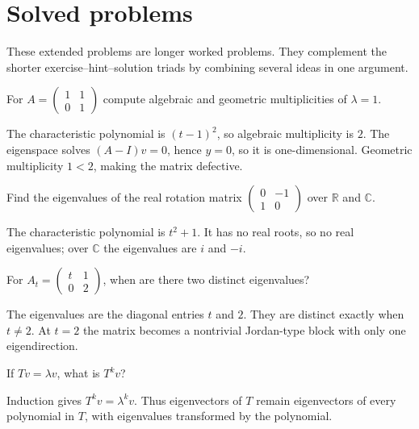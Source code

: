 \section{Solved problems}
These extended problems are longer worked problems. They complement the shorter exercise--hint--solution triads by combining several ideas in one argument.

\begin{problem}\label{prob:i09-problem-01}
For $A=\begin{pmatrix}1&1\\0&1\end{pmatrix}$ compute algebraic and geometric multiplicities of $\lambda=1$.
\end{problem}
\begin{solution}
The characteristic polynomial is $(t-1)^2$, so algebraic multiplicity is $2$. The eigenspace solves $(A-I)v=0$, hence $y=0$, so it is one-dimensional. Geometric multiplicity $1<2$, making the matrix defective.
\end{solution}

\begin{problem}\label{prob:i09-problem-02}
Find the eigenvalues of the real rotation matrix $\begin{pmatrix}0&-1\\1&0\end{pmatrix}$ over $\mathbb R$ and $\mathbb C$.
\end{problem}
\begin{solution}
The characteristic polynomial is $t^2+1$. It has no real roots, so no real eigenvalues; over $\mathbb C$ the eigenvalues are $i$ and $-i$.
\end{solution}

\begin{problem}\label{prob:i09-problem-03}
For $A_t=\begin{pmatrix}t&1\\0&2\end{pmatrix}$, when are there two distinct eigenvalues?
\end{problem}
\begin{solution}
The eigenvalues are the diagonal entries $t$ and $2$. They are distinct exactly when $t\ne2$. At $t=2$ the matrix becomes a nontrivial Jordan-type block with only one eigendirection.
\end{solution}

\begin{problem}\label{prob:i09-problem-04}
If $Tv=\lambda v$, what is $T^kv$?
\end{problem}
\begin{solution}
Induction gives $T^kv=\lambda^kv$. Thus eigenvectors of $T$ remain eigenvectors of every polynomial in $T$, with eigenvalues transformed by the polynomial.
\end{solution}

